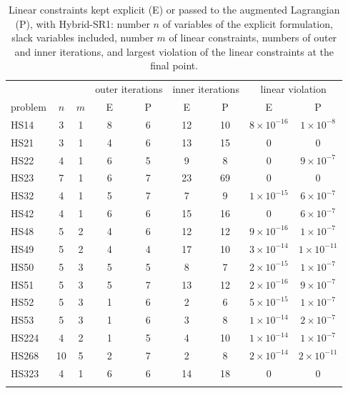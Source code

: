 \documentclass[pdflatex,sn-mathphys-num]{sn-jnl}%
\theoremstyle{thmstyleone}%
\begin{document}
\begin{table}[htbp]
	\centering
	\caption{Linear constraints kept explicit (E) or passed to the augmented Lagrangian (P), with Hybrid-SR1: number $n$ of variables of the explicit formulation, slack variables included, number $m$ of linear constraints, numbers of outer and inner iterations, and largest violation of the linear constraints at the final point.}\label{tab:linear_constraints}
	\begin{tabular}{lcccccccc}
		\toprule
		& & & \multicolumn{2}{c}{outer iterations} & \multicolumn{2}{c}{inner iterations} & \multicolumn{2}{c}{linear violation} \\
		problem & $n$ & $m$ & E & P & E & P & E & P \\
		\midrule
		HS14 & 3 & 1 & 8 & 6 & 12 & 10 & $8\times10^{-16}$ & $1\times10^{-8}$ \\
		HS21 & 3 & 1 & 4 & 6 & 13 & 15 & 0 & 0 \\
		HS22 & 4 & 1 & 6 & 5 & 9 & 8 & 0 & $9\times10^{-7}$ \\
		HS23 & 7 & 1 & 6 & 7 & 23 & 69 & 0 & 0 \\
		HS32 & 4 & 1 & 5 & 7 & 7 & 9 & $1\times10^{-15}$ & $6\times10^{-7}$ \\
		HS42 & 4 & 1 & 6 & 6 & 15 & 16 & 0 & $6\times10^{-7}$ \\
		HS48 & 5 & 2 & 4 & 6 & 12 & 12 & $9\times10^{-16}$ & $1\times10^{-7}$ \\
		HS49 & 5 & 2 & 4 & 4 & 17 & 10 & $3\times10^{-14}$ & $1\times10^{-11}$ \\
		HS50 & 5 & 3 & 5 & 5 & 8 & 7 & $2\times10^{-15}$ & $1\times10^{-7}$ \\
		HS51 & 5 & 3 & 5 & 7 & 13 & 12 & $2\times10^{-16}$ & $9\times10^{-7}$ \\
		HS52 & 5 & 3 & 1 & 6 & 2 & 6 & $5\times10^{-15}$ & $1\times10^{-7}$ \\
		HS53 & 5 & 3 & 1 & 6 & 3 & 8 & $1\times10^{-14}$ & $2\times10^{-7}$ \\
		HS224 & 4 & 2 & 1 & 5 & 4 & 10 & $1\times10^{-14}$ & $1\times10^{-7}$ \\
		HS268 & 10 & 5 & 2 & 7 & 2 & 8 & $2\times10^{-14}$ & $2\times10^{-11}$ \\
		HS323 & 4 & 1 & 6 & 6 & 14 & 18 & 0 & 0 \\
		\botrule
	\end{tabular}

\end{table}
\end{document}
